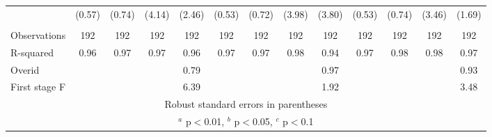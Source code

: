 \documentclass[]{article}
\begin{document}
\begin{tabular}{lcccccccccccc}
 & (0.57) & (0.74) & (4.14) & (2.46) & (0.53) & (0.72) & (3.98) & (3.80) & (0.53) & (0.74) & (3.46) & (1.69) \\
 &  &  &  &  &  &  &  &  &  &  &  &  \\
Observations & 192 & 192 & 192 & 192 & 192 & 192 & 192 & 192 & 192 & 192 & 192 & 192 \\
R-squared & 0.96 & 0.97 & 0.97 & 0.96 & 0.97 & 0.97 & 0.98 & 0.94 & 0.97 & 0.98 & 0.98 & 0.97 \\
Overid &  &  &  & 0.79 &  &  &  & 0.97 &  &  &  & 0.93 \\
 First stage F &  &  &  & 6.39 &  &  &  & 1.92 &  &  &  & 3.48 \\ \hline
\multicolumn{13}{c}{ Robust standard errors in parentheses} \\
\multicolumn{13}{c}{ $^a$ p$<$0.01, $^b$ p$<$0.05, $^c$ p$<$0.1} \\
\end{tabular}
\end{document}
